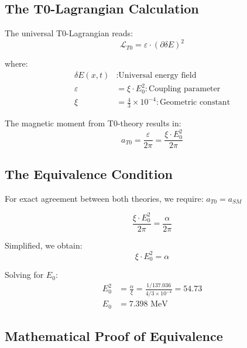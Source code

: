 \documentclass[12pt,a4paper]{article}
\numberwithin{equation}{section}
\newcommand{\xipar}{\xi}
\newcommand{\calL}{\mathcal{L}}
\begin{document}
	\subsection{The T0-Lagrangian Calculation}
	
	The universal T0-Lagrangian reads:
	\begin{equation}
		\label{eq:t0_lagrangian}
		\calL_{T0} = \varepsilon \cdot (\partial \delta E)^2
	\end{equation}
	
	where:
	\begin{align}
		\delta E(x,t) &: \text{Universal energy field}\\
		\varepsilon &= \xipar \cdot E_0^2 : \text{Coupling parameter}\\
		\xipar &= \frac{4}{3} \times 10^{-4} : \text{Geometric constant}
	\end{align}
	
	The magnetic moment from T0-theory results in:
	\begin{equation}
		\label{eq:magnetic_moment_t0}
		a_{T0} = \frac{\varepsilon}{2\pi} = \frac{\xipar \cdot E_0^2}{2\pi}
	\end{equation}
	
	\subsection{The Equivalence Condition}
	
	For exact agreement between both theories, we require: $a_{T0} = a_{SM}$
	
	\begin{equation}
		\label{eq:equivalence_condition}
		\frac{\xipar \cdot E_0^2}{2\pi} = \frac{\alpha}{2\pi}
	\end{equation}
	
	Simplified, we obtain:
	\begin{equation}
		\label{eq:simplified_equivalence}
		\xipar \cdot E_0^2 = \alpha
	\end{equation}
	
	Solving for $E_0$:
	\begin{align}
		E_0^2 &= \frac{\alpha}{\xipar} = \frac{1/137.036}{4/3 \times 10^{-4}} = 54.73\\
		E_0 &= 7.398 \text{ MeV}
	\end{align}
	
	\subsection{Mathematical Proof of Equivalence}
	
\end{document}
